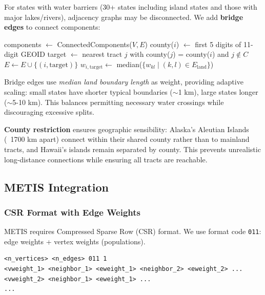 For states with water barriers (30+ states including island states and those with major lakes/rivers), adjacency graphs may be disconnected. We add \textbf{bridge edges} to connect components:

\begin{algorithmic}[1]
    \State components $\gets$ ConnectedComponents($V, E$)
            \State county($i$) $\gets$ first 5 digits of 11-digit GEOID
            \State target $\gets$ nearest tract $j$ with county($j$) = county($i$) and $j \notin C$
                \State $E \gets E \cup \{(i, \text{target})\}$
                \State $w_{i,\text{target}} \gets$ median($\{w_{kl} \mid (k,l) \in E_{\text{land}}\}$)
            \EndIf
        \EndFor
    \EndFor
\EndFunction
\end{algorithmic}

Bridge edges use \textit{median land boundary length} as weight, providing adaptive scaling: small states have shorter typical boundaries ($\sim$1 km), large states longer ($\sim$5-10 km). This balances permitting necessary water crossings while discouraging excessive splits.

\textbf{County restriction} ensures geographic sensibility: Alaska's Aleutian Islands (~1700 km apart) connect within their shared county rather than to mainland tracts, and Hawaii's islands remain separated by county. This prevents unrealistic long-distance connections while ensuring all tracts are reachable.

\subsection{METIS Integration}

\subsubsection{CSR Format with Edge Weights}

METIS requires Compressed Sparse Row (CSR) format. We use format code \texttt{011}: edge weights + vertex weights (populations).

\begin{verbatim}
<n_vertices> <n_edges> 011 1
<vweight_1> <neighbor_1> <eweight_1> <neighbor_2> <eweight_2> ...
<vweight_2> <neighbor_1> <eweight_1> ...
...
\end{verbatim}

